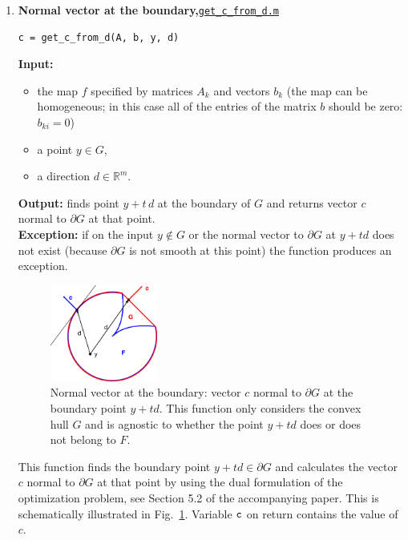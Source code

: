 \documentclass[a4paper]{article}
\newcommand{\R}{\mathbb{R}}
\theoremstyle{definition}
\begin{document}
\begin{enumerate}
The variable $\tt t$ on return contains the value of $t$, the variable {\tt  is\_in\_F=1} if the boundary point $y+t\,d$ belongs to $F$, and variable {\tt  is\_in\_F=0} if feasibility of $y+t\,d$ with respect to $F$ is uncertain.


\item {\bf Normal vector at the boundary,\hskip 6pt}\underline{\tt get\_c\_from\_d.m} 
\begin{verbatim}
c = get_c_from_d(A, b, y, d)
\end{verbatim}
{\bf Input:}
\begin{itemize}
	\item the map $f$ specified by matrices $A_k$ and vectors $b_k$ (the map can be homogeneous; in this case all of the entries of the matrix $b$ should be zero: $b_{ki}=0$)
	\item a point $y\in G$,
	\item a direction $d\in\R^m$.
\end{itemize}
{\bf Output:}  finds point $y+t\,d$ at the boundary of $G$ and returns vector $c$ normal to $\partial G$ at that point.\\
{\bf Exception:} if on the input $y\notin G$ or the normal vector to $\partial G$ at $y+td$ does not exist (because $\partial G$ is not smooth at this point)  the function produces an exception.


\begin{figure}[H]
	\centering\includegraphics[width=100pt]{fig/get_c_from_d}
\captionsetup{width=.8\linewidth}
	\caption{Normal vector at the boundary: vector $c$ normal to $\partial G$ at the boundary point $y+td$. This function only considers the convex hull $G$ and is agnostic to whether the point $y+td$ does or does not belong to $F$.}
\label{fig:three}
\end{figure}

This function finds the boundary point $y+td\in \partial G$ and calculates the vector $c$ normal to $\partial G$ at that point by using the dual formulation of the optimization problem, see Section 5.2 of the accompanying paper.
This is schematically illustrated in Fig.~\ref{fig:three}. Variable $\tt c$ on return contains the value of $c$.


\end{enumerate}
\end{document}
